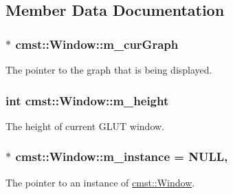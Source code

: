 \subsection{Member Data Documentation}
\subsubsection[{\texorpdfstring{m\_curGraph}{m_curGraph}}]{$\ast$ cmst::Window::m\_curGraph\hspace{0.3cm}{\ttfamily [private]}}\hypertarget{classcmst_1_1_window_a86d6a605ac3dc593de030802009e73bc}{}\label{classcmst_1_1_window_a86d6a605ac3dc593de030802009e73bc}


The pointer to the graph that is being displayed. 

\subsubsection[{\texorpdfstring{m\_height}{m_height}}]{\setlength{\rightskip}{0pt plus 5cm}int cmst::Window::m\_height\hspace{0.3cm}{\ttfamily [private]}}\hypertarget{classcmst_1_1_window_a9447754382ddb8894d50a40d19f027a3}{}\label{classcmst_1_1_window_a9447754382ddb8894d50a40d19f027a3}


The height of current GLUT window. 

\subsubsection[{\texorpdfstring{m\_instance}{m_instance}}]{ $\ast$ cmst::Window::m\_instance = NULL\hspace{0.3cm}{\ttfamily [static]}, {\ttfamily [private]}}\hypertarget{classcmst_1_1_window_a04ea9e382288b5d903542ee3f53b3617}{}\label{classcmst_1_1_window_a04ea9e382288b5d903542ee3f53b3617}


The pointer to an instance of \hyperlink{classcmst_1_1_window}{cmst::Window}. 


